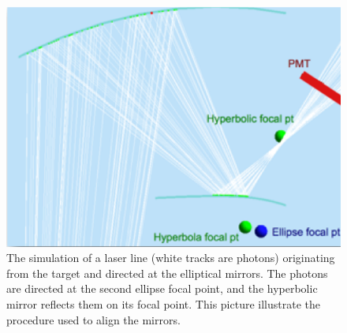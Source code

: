 \begin{figure}[h]
\centering
	\includegraphics[width=0.95\columnwidth, keepaspectratio]{img/mirrorAlignmentSimulationZoomed.png}
	\caption{The simulation of a laser line (white tracks are photons) originating from the target and directed at the elliptical mirrors. The photons are directed
		      at the second ellipse focal point, and the hyperbolic mirror reflects them on its focal point. This picture illustrate the procedure used to align the mirrors.}
	\label{fig:alignmentSimulation}
\end{figure}


